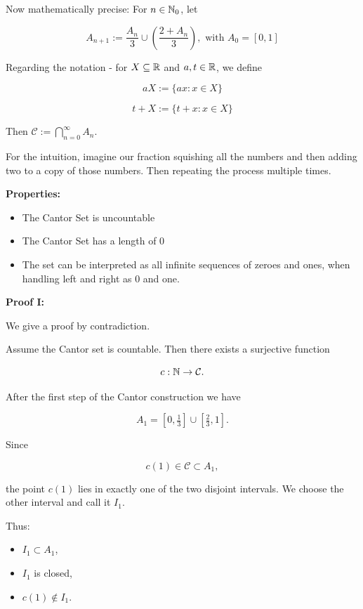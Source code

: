Now mathematically precise: For \(n\in\mathbb{N}_0\), let

\[
	A_{n+1}:=\frac{A_n}{3} \cup (\frac{2+A_n}{3}), \text{ with } A_0 = [0,1]
\]

Regarding the notation - for \(X\subseteq\mathbb{R}\) and \(a,t\in\mathbb{R}\), we define

\[
	aX:=\{ax:x\in X\}
\]

\[
	t+X:=\{t+x:x\in X\}
\]

Then \(\mathcal{C}:=\bigcap_{n=0}^\infty A_n\).

For the intuition, imagine our fraction squishing all the numbers and then adding two to a copy of those numbers. Then repeating
the process multiple times.

\textbf{Properties:}

\begin{itemize}

	\item The Cantor Set is uncountable

	\item The Cantor Set has a length of 0

	\item The set can be interpreted as all infinite sequences of zeroes and ones, when handling left and right as 0 and one.

\end{itemize}

\textbf{Proof I:}

We give a proof by contradiction.

Assume the Cantor set is countable. Then there exists a surjective function

\[
	c : \mathbb{N} \to \mathcal{C}.
\]

After the first step of the Cantor construction we have

\[
	A_{1} = [0,\tfrac{1}{3}] \cup [\tfrac{2}{3}, 1].
\]

Since

\[
	c(1) \in \mathcal{C} \subset A_{1},
\]

the point \(c(1)\) lies in exactly one of the two disjoint intervals.
We choose the other interval and call it \(I_{1}\).

Thus:

\begin{itemize}

	\item \(I_{1} \subset A_{1}\),

	\item \(I_{1}\) is closed,

	\item \(c(1) \notin I_{1}\).

\end{itemize}



